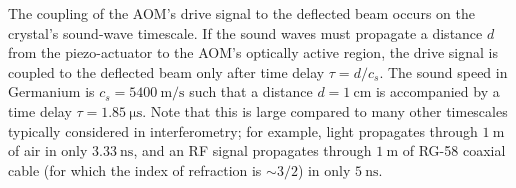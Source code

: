 The coupling of the AOM's drive signal to the deflected beam
occurs on the crystal's sound-wave timescale.
If the sound waves must propagate a distance $d$
from the piezo-actuator to the AOM's optically active region,
the drive signal is coupled to the deflected beam
only after time delay $\tau = d / c_s$.
\graffito{\textcolor{red}{reference?}}
The sound speed in Germanium is $c_s = \SI{5400}{\meter\per\second}$
such that a distance $d = \SI{1}{\centi\meter}$
is accompanied by a time delay $\tau = \SI{1.85}{\micro\second}$.
Note that this is large compared to many other timescales
typically considered in interferometry;
for example, light propagates
through $\SI{1}{\meter}$ of air
in only $\SI{3.33}{\nano\second}$,
and an RF signal propagates
through $\SI{1}{\meter}$ of RG-58 coaxial cable
(for which the index of refraction is $\sim 3 / 2$)
in only $\SI{5}{\nano\second}$.

